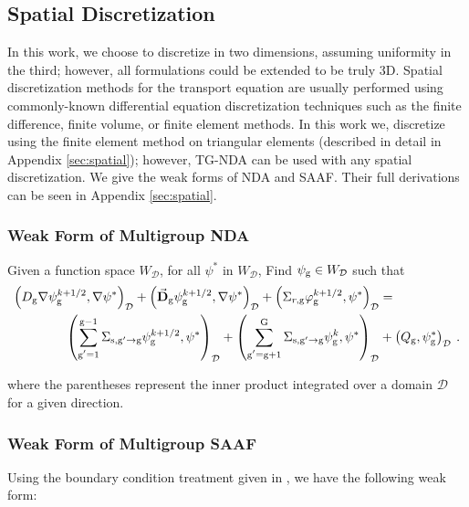 \subsection{Spatial Discretization}
In this work, we choose to discretize in two dimensions, assuming uniformity in the third; however, all formulations could be extended to be truly 3D. Spatial discretization methods for the transport equation are usually performed using commonly-known differential equation discretization techniques such as the finite difference, finite volume, or finite element methods. In this work we, discretize using the finite element method on triangular elements (described in detail in Appendix \ref{sec:spatial}); however, TG-NDA can be used with any spatial discretization. We give the weak forms of NDA and SAAF. Their full derivations can be seen in Appendix \ref{sec:spatial}. 


\subsubsection{Weak Form of Multigroup NDA}

Given a function space $W_\mathcal{D}$, for all $\psi^*$ in $W_\mathcal{D}$, Find $\psi_{\mathrm{g}} \in W_\mathcal{D}$ such that
%
\begin{equation}
 \begin{split}
  \left(D_{\mathrm{g}} \nabla \psi_{\mathrm{g}}^{k+1/2}, \nabla \psi^*\right)_\mathcal{D} + \left(\vec{\bf{D}}_{\mathrm{g}} \psi_{\mathrm{g}}^{k+1/2} , \nabla \psi^*\right)_\mathcal{D} +  \left(\Sigma_{r,\mathrm{g}} \varphi_{\mathrm{g}}^{k+1/2}, \psi^*\right)_\mathcal{D} &=  \\
   \left(\sum\limits_{\substack{\mathrm{g}'=1}}^{\mathrm{g-1}} \Sigma_{\mathrm{s},\mathrm{g}' \to\mathrm{g}}\psi_{\mathrm{g}}^{k+1/2}, \psi^*\right)_\mathcal{D} + \left(\sum\limits_{\substack{\mathrm{g}'=\mathrm{g}+1}}^{\mathrm{G}} \Sigma_{\mathrm{s},\mathrm{g}' \to\mathrm{g}}\psi_{\mathrm{g}}^{k}, \psi^*\right)_\mathcal{D} 
  &+ \left(Q_{\mathrm{g}}, \psi^*_{\mathrm{g}}\right)_\mathcal{D} \:.
 \end{split}
 \label{k1/2}
\end{equation}

where the parentheses represent the inner product integrated over a domain $\mathcal{D}$ for a given direction.

\subsubsection{Weak Form of Multigroup SAAF}
Using the boundary condition treatment given in \cite{zheng-thesis}, we have the following weak form:

